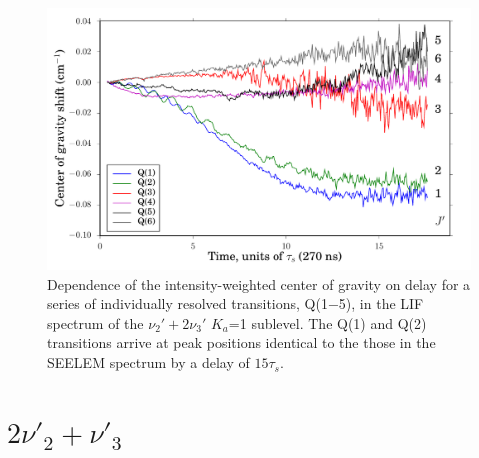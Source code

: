 \documentclass[12pt]{mitthesis}
\begin{document}
\begin{figure}
  \caption{Dependence of the intensity-weighted center of gravity on
    delay for a series of individually resolved transitions, Q(1$-$5),
    in the LIF spectrum of the $\nu_2'+2\nu_3'$ $K_a$=1 sublevel.  The
    Q(1) and Q(2) transitions arrive at peak positions identical to
    the those in the SEELEM spectrum by a delay of $15\tau_s$.}
  \label{fig:2132-q123456-cog-delay}
  \centering
  \vspace{1cm}
  \includegraphics[width=6in]{2132-q123456-cog-delay.pdf}
\end{figure}

\section{$2\nu'_2+\nu'_3$}
\end{document}
